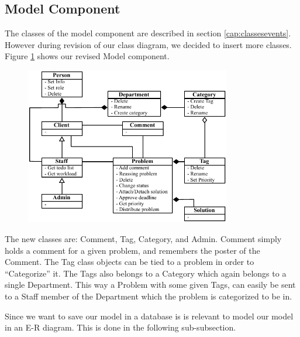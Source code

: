 \subsection{Model Component}
\label{sub:modelComponent}
The classes of the model component are described in section \ref{cap:classesevents}.
However during revision of our class diagram, we decided to insert more classes.
Figure \ref{fig:modelComponent} shows our revised Model component.

\begin{figure}[hbt]
	\centering
		\includegraphics[width=0.80\textwidth]{input/component_design/Modelcomponent.pdf}
	\label{fig:modelComponent}
\end{figure}

The new classes are: Comment, Tag, Category, and Admin.
Comment simply holds a comment for a given problem, and remembers the poster of the Comment.
The Tag class objects can be tied to a problem in order to ``Categorize'' it.
The Tags also belongs to a Category which again belongs to a single Department.
This way a Problem with some given Tags, can easily be sent to a Staff member of the Department which the problem is categorized to be in.

Since we want to save our model in a database is is relevant to model our model in an E-R diagram.
This is done in the following sub-subsection.
